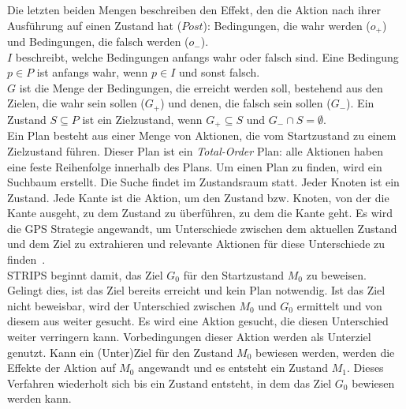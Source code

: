 Die letzten beiden Mengen beschreiben den Effekt, den die Aktion nach ihrer Ausführung auf einen Zustand hat ($Post$): Bedingungen, die wahr werden ($o_+$) und Bedingungen, die falsch werden ($o_-$).\\
$I$ beschreibt, welche Bedingungen anfangs wahr oder falsch sind.
Eine Bedingung $p\in P$ ist anfangs wahr, wenn $p\in I$ und sonst falsch.\\
$G$ ist die Menge der Bedingungen, die erreicht werden soll, bestehend aus den Zielen, die wahr sein sollen ($G_+$) und denen, die falsch sein sollen ($G_-$).
Ein Zustand $S\subseteq P$  ist ein Zielzustand, wenn $G_+\subseteq S$ und $G_-\cap S =\emptyset$.\\
Ein Plan besteht aus einer Menge von Aktionen, die vom Startzustand zu einem Zielzustand führen.
Dieser Plan ist ein \emph{Total-Order} Plan: alle Aktionen haben eine feste Reihenfolge innerhalb des Plans.
Um einen Plan zu finden, wird ein Suchbaum erstellt.
Die Suche findet im Zustandsraum statt.
Jeder Knoten ist ein Zustand.
Jede Kante ist die Aktion, um den Zustand bzw. Knoten, von der die Kante ausgeht, zu dem Zustand zu überführen, zu dem die Kante geht.
Es wird die GPS Strategie angewandt, um Unterschiede zwischen dem aktuellen Zustand und dem Ziel zu extrahieren und relevante Aktionen für diese Unterschiede zu finden~\cite{FIKES1971189}.\\
\ac{STRIPS} beginnt damit, das Ziel $G_0$ für den Startzustand $M_0$ zu beweisen.
Gelingt dies, ist das Ziel bereits erreicht und kein Plan notwendig.
Ist das Ziel nicht beweisbar, wird der Unterschied zwischen $M_0$ und $G_0$ ermittelt und von diesem aus weiter gesucht.
Es wird eine Aktion gesucht, die diesen Unterschied weiter verringern kann.
Vorbedingungen dieser Aktion werden als Unterziel genutzt.
Kann ein (Unter)Ziel für den Zustand $M_0$ bewiesen werden, werden die Effekte der Aktion auf $M_0$ angewandt und es entsteht ein Zustand $M_1$.
Dieses Verfahren wiederholt sich bis ein Zustand entsteht, in dem das Ziel $G_0$ bewiesen werden kann.
